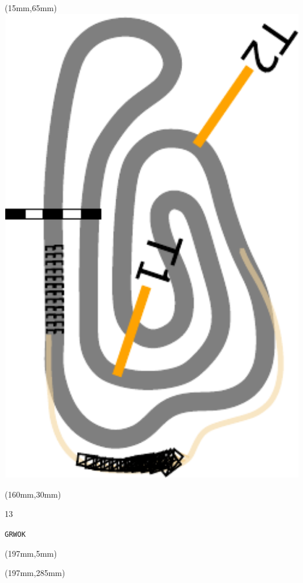 \begin{textblock*}{185mm}(15mm,65mm)%
\centering
\mbox{\includegraphics[width=185mm,height=210mm,keepaspectratio]{PT/GRWOK.pdf}}
\end{textblock*}
\begin{textblock*}{40mm}(160mm,30mm)%
\Large
\par{} 
\par13 
\par\hfill\tiny\tt GRWOK\\
\end{textblock*}
\begin{textblock*}{20mm}(197mm,5mm)%
\fbox{\thepage}
\label{GRWOK}
\end{textblock*}
\begin{textblock*}{20mm}(197mm,285mm)%
\fbox{\thepage}
\end{textblock*}

